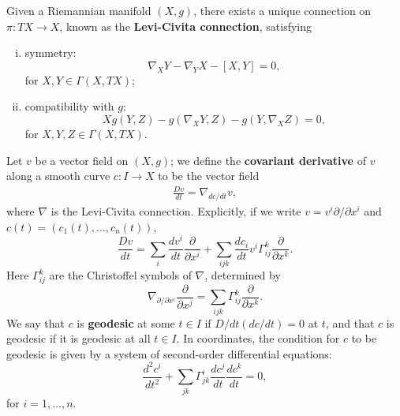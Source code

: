 \documentclass{amsart}
\begin{document}
\begin{theorem}
    Given a Riemannian manifold $(X,g)$, there exists a unique connection on $\pi:TX\to X$,
    known as the \textbf{Levi-Civita connection}, satisfying
    \begin{enumerate}[(i)]
        \item symmetry:
            \begin{equation*}
                \nabla_XY-\nabla_YX-[X,Y]=0,
            \end{equation*}
            for $X,Y\in\Gamma(X,TX)$;
        \item compatibility with $g$:
            \begin{equation*}
                Xg(Y,Z)-g(\nabla_XY,Z)-g(Y,\nabla_XZ)=0,
            \end{equation*}
            for $X,Y,Z\in\Gamma(X,TX)$.
    \end{enumerate}
\end{theorem}

\begin{definition}
    Let $v$ be a vector field on $(X,g)$; we define the \textbf{covariant derivative} of $v$
    along a smooth curve $c:I\to X$ to be the vector field
    \begin{align*}
        \frac{Dv}{dt} = \nabla_{dc/dt}v,
    \end{align*}
    where $\nabla$ is the Levi-Civita connection. Explicitly, if we write $v=v^i\partial/\partial x^i$
    and $c(t)=(c_1(t),\ldots,c_n(t))$,
    \begin{equation*}
        \frac{Dv}{dt} = \sum_i \frac{dv^i}{dt}\frac{\partial}{\partial x^i} + \sum_{ijk}\frac{dc_i}{dt}v^i\Gamma_{ij}^k\frac{\partial}{\partial x^k}.
    \end{equation*}
    Here $\Gamma_{ij}^k$ are the Christoffel symbols of $\nabla$, determined by
    \begin{equation*}
        \nabla_{\partial/\partial x^i}\frac{\partial}{\partial x^j}=\sum_{ijk}\Gamma^k_{ij}\frac{\partial}{\partial x^k}.
    \end{equation*}
    We say that $c$ is \textbf{geodesic} at some $t\in I$ if $D/dt(dc/dt)=0$ at $t$,
    and that $c$ is geodesic if it is geodesic at all $t\in I$. In coordinates, the condition
    for $c$ to be geodesic is given by a system of second-order differential equations:
    \begin{equation*}
        \frac{d^2 c^i}{dt^2} + \sum_{jk}\Gamma_{jk}^i\frac{dc^j}{dt}\frac{dc^k}{dt}=0,
    \end{equation*}
    for $i=1,\ldots, n.$
\end{definition}
\end{document}
